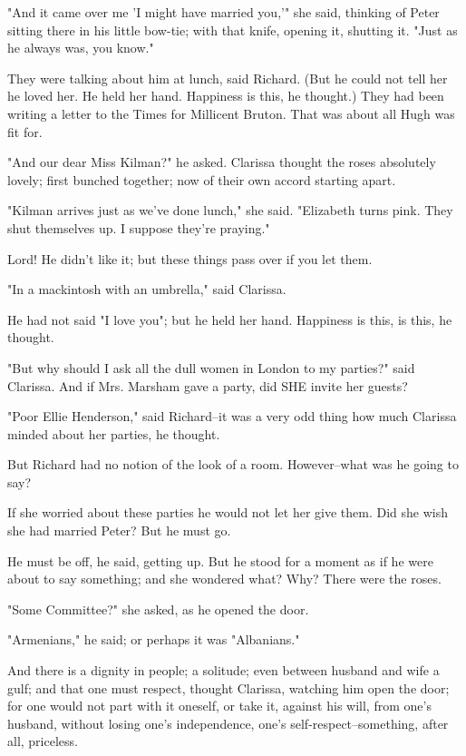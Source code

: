 \documentclass[lang=cn,10pt]{elegantbook}
\begin{document}
"And it came over me 'I might have married you,'" she said,
thinking of Peter sitting there in his little bow-tie; with that
knife, opening it, shutting it.  "Just as he always was, you know."

They were talking about him at lunch, said Richard.  (But he could
not tell her he loved her.  He held her hand.  Happiness is this,
he thought.)  They had been writing a letter to the Times for
Millicent Bruton.  That was about all Hugh was fit for.

"And our dear Miss Kilman?" he asked.  Clarissa thought the roses
absolutely lovely; first bunched together; now of their own accord
starting apart.

"Kilman arrives just as we've done lunch," she said.  "Elizabeth
turns pink.  They shut themselves up.  I suppose they're praying."

Lord!  He didn't like it; but these things pass over if you let
them.

"In a mackintosh with an umbrella," said Clarissa.

He had not said "I love you"; but he held her hand.  Happiness is
this, is this, he thought.

"But why should I ask all the dull women in London to my parties?"
said Clarissa.  And if Mrs. Marsham gave a party, did SHE invite
her guests?

"Poor Ellie Henderson," said Richard--it was a very odd thing how
much Clarissa minded about her parties, he thought.

But Richard had no notion of the look of a room.  However--what was
he going to say?

If she worried about these parties he would not let her give them.
Did she wish she had married Peter?  But he must go.

He must be off, he said, getting up.  But he stood for a moment as
if he were about to say something; and she wondered what?  Why?
There were the roses.

"Some Committee?" she asked, as he opened the door.

"Armenians," he said; or perhaps it was "Albanians."

And there is a dignity in people; a solitude; even between husband
and wife a gulf; and that one must respect, thought Clarissa,
watching him open the door; for one would not part with it oneself,
or take it, against his will, from one's husband, without losing
one's independence, one's self-respect--something, after all,
priceless.
\end{document}
